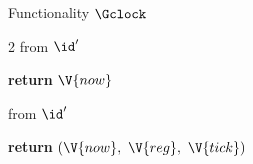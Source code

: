 \begin{interface}[nofloat]{Functionality $\Gclock$ \\
}
{\begin{multicols}{2}
 \quad from $\id'$
\begin{algorithmic}[1]
\algcont
\State \textbf{return} $\V{now}$
\algsave
\end{algorithmic}
\vspace{1.4ex}

 \quad from $\id'$
\begin{algorithmic}[1]
\algcont
\State \textbf{return} $(\V{now},\ \V{reg},\ \V{tick})$
\algsave
\end{algorithmic}
\end{multicols}}
\end{interface}
